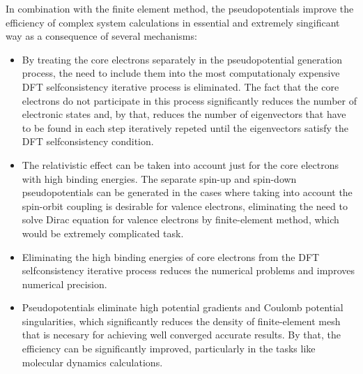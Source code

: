 In combination with the finite element method, the pseudopotentials improve the
efficiency of complex system calculations in essential and extremely
singificant way as a consequence of several mechanisms:
\begin{itemize}

\item By treating the core electrons separately in the pseudopotential
generation process, the need to include them into the most computationaly
expensive DFT selfconsistency iterative process is eliminated.  The fact that
the core electrons do not participate in this process significantly reduces the
number of electronic states and, by that, reduces the number of eigenvectors
that have to be found in each step iteratively repeted until the eigenvectors
satisfy the DFT selfconsistency condition.

\item The relativistic effect can be taken into account just for the core
electrons with high binding energies. The separate spin-up and spin-down
pseudopotentials can be generated in the cases where taking into account the
spin-orbit coupling is desirable for valence electrons, eliminating the need to
solve Dirac equation for valence electrons by finite-element method, which
would be extremely complicated task.

\item Eliminating the high binding energies of core electrons from the DFT
selfconsistency iterative process reduces the numerical problems and improves
numerical precision.

\item Pseudopotentials eliminate high potential gradients and Coulomb potential
singularities, which significantly reduces the density of finite-element mesh
that is necesary for achieving well converged accurate results. By that, the
efficiency can be significantly improved, particularly in the tasks like
molecular dynamics calculations.

\end{itemize}

